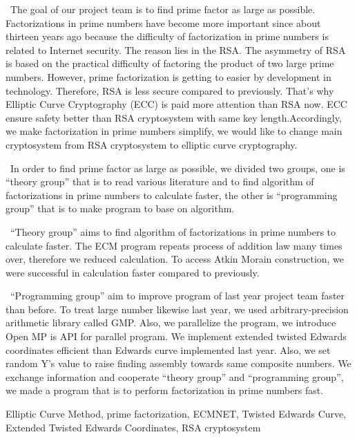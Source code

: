 \documentclass[openany,11pt,papersize]{jsbook}
\begin{document}

\begin{eabstract}

~The goal of our project team is to find prime factor as large as possible. Factorizations in prime numbers have become more important since about thirteen years ago because the difficulty of factorization in prime numbers is related to Internet security. The reason lies in the RSA. The asymmetry of RSA is based on the practical difficulty of factoring the product of two large prime numbers. However, prime factorization is getting to easier by development in technology. Therefore, RSA is less secure compared to previously. That's why Elliptic Curve Cryptography (ECC) is paid more attention than RSA now. ECC ensure safety better than RSA cryptosystem with same key length.Accordingly, we make factorization in prime numbers simplify, we would like to change main cryptosystem from RSA cryptosystem to elliptic curve cryptography.

~In order to find prime factor as large as possible, we divided two groups, one is “theory group” that is to read various literature and to find algorithm of factorizations in prime numbers to calculate faster, the other is “programming group” that is to make program to base on algorithm.

 ~“Theory group” aims to find algorithm of factorizations in prime numbers to calculate faster. The ECM program repeats process of addition law many times over, therefore we reduced calculation. To access Atkin Morain construction, we were successful in calculation faster compared to previously.

~“Programming group” aim to improve program of last year project team faster than before. To treat large number likewise last year, we used arbitrary-precision arithmetic library called GMP. Also, we parallelize the program, we introduce Open MP is API for parallel program. We implement extended twisted Edwards coordinates efficient than Edwards curve implemented last year. Also, we set random Y’s value to raise finding assembly towards same composite numbers.
 We exchange information and cooperate “theory group” and “programming group”, we made a program that is to perform factorization in prime numbers fast.
\begin{ekeyword}
Elliptic Curve Method, prime factorization, ECMNET, Twisted Edwards Curve, Extended Twisted Edwards Coordinates, RSA cryptosystem
\end{ekeyword}
\end{eabstract}
\end{document}
